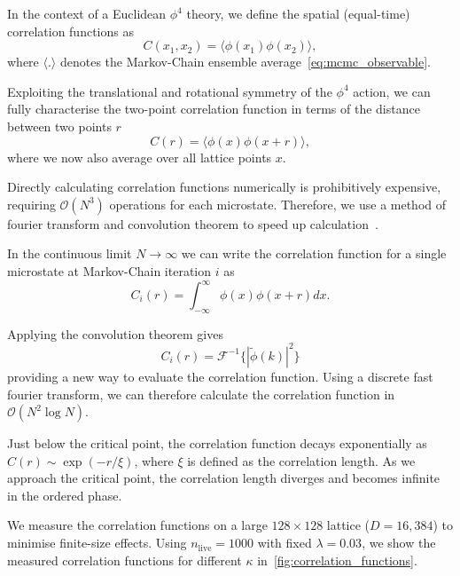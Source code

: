 \documentclass[11pt]{article}
\begin{document}
    In the context of a Euclidean $\phi^4$ theory, we define the spatial (equal-time) correlation functions as
    \begin{equation}\label{eq:full_correlation_function}
    C(x_1, x_2) = \langle \phi(x_1) \phi(x_2) \rangle,
    \end{equation}
    where $\langle . \rangle$ denotes the Markov-Chain ensemble average~\eqref{eq:mcmc_observable}.

    Exploiting the translational and rotational symmetry of the $\phi^4$ action, we can fully characterise the two-point
    correlation function in terms of the distance between two points $r$
    \begin{equation}\label{eq:correlation_function}
    C(r) = \langle \phi(x) \phi(x + r) \rangle,
    \end{equation}
    where we now also average over all lattice points $x$.

    Directly calculating correlation functions numerically is prohibitively expensive, requiring $\mathcal{O}(N^3)$
    operations for each microstate.
    Therefore, we use a method of fourier transform and convolution theorem to speed up
    calculation~\cite{Ruge_1994}.

    In the continuous limit $N \rightarrow \infty$ we can write the correlation function for a single microstate at
    Markov-Chain iteration $i$ as
    \begin{equation}\label{eq:continuous_correlation}
        C_{i}(r) = \int_{-\infty}^{\infty} \phi(x) \phi(x + r) dx.
    \end{equation}

    Applying the convolution theorem gives
    \begin{equation}\label{eq:convolution_theorem}
        C_{i}(r) = \mathcal{F}^{-1} \{ |\tilde{\phi}(k)|^2 \}
    \end{equation}
    providing a new way to evaluate the correlation function.
    Using a discrete fast fourier transform, we can therefore calculate the correlation function in
    $\mathcal{O}(N^2 \log N)$.

    Just below the critical point, the correlation function decays exponentially as $C(r) \sim \exp(-r / \xi)$,
    where $\xi$ is defined as the correlation length.
    As we approach the critical point, the correlation length diverges and becomes infinite in the ordered phase.

    We measure the correlation functions on a large $128 \times 128$ lattice ($D=16,384$) to minimise finite-size effects.
    Using $n_{\text{live}}=1000$ with fixed $\lambda=0.03$, we show the measured correlation functions for different $\kappa$
    in~\cref{fig:correlation_functions}.
\end{document}
